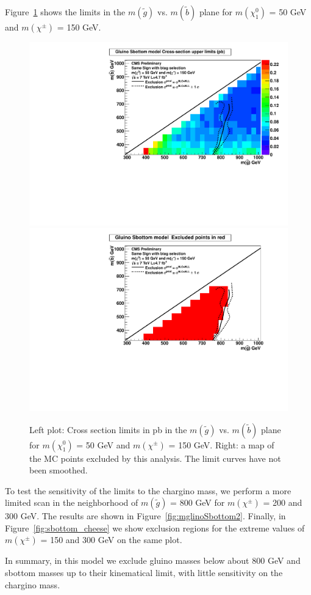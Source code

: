 Figure~\ref{fig:mglinoSbottom} shows the limits in 
the $m(\widetilde{g})$ vs. 
$m(\widetilde{b})$ plane
for $m(\chi_1^0)$ = 50 GeV and 
$m(\chi^{\pm})$ = 150 GeV. 



\begin{figure}[htb]
\begin{center}
\includegraphics[width=0.49\linewidth]{figs/B2_LimitsOnCarpet_150.pdf}
\includegraphics[width=0.49\linewidth]{figs/B2_ExcludedRegionMap_150.pdf}
\caption{Left plot: Cross section limits in pb in the $m(\widetilde{g})$ vs. 
$m(\widetilde{b})$ plane
for $m(\chi_1^0)$ = 50 GeV and 
$m(\chi^{\pm})$ = 150 GeV.
Right: a map of the MC points excluded by this analysis.
The limit curves have not been smoothed.
\label{fig:mglinoSbottom}}
\end{center}
\end{figure}

To test the sensitivity of the limits to the chargino mass, 
we perform a more limited scan in the neighborhood of 
$m(\widetilde{g})$ = 800 GeV for $m(\chi^{\pm})$ = 200 and 
300 GeV.  The results are shown in Figure~\ref{fig:mglinoSbottom2}.
Finally, in Figure~\ref{fig:sbottom_cheese} we show exclusion
regions for the extreme values of 
$m(\chi^{\pm})$ = 150 and 300 GeV on the same plot.

In summary, in this model 
we exclude gluino masses below about 800 GeV and 
sbottom masses up to their kinematical limit,
with little sensitivity on the chargino mass.


